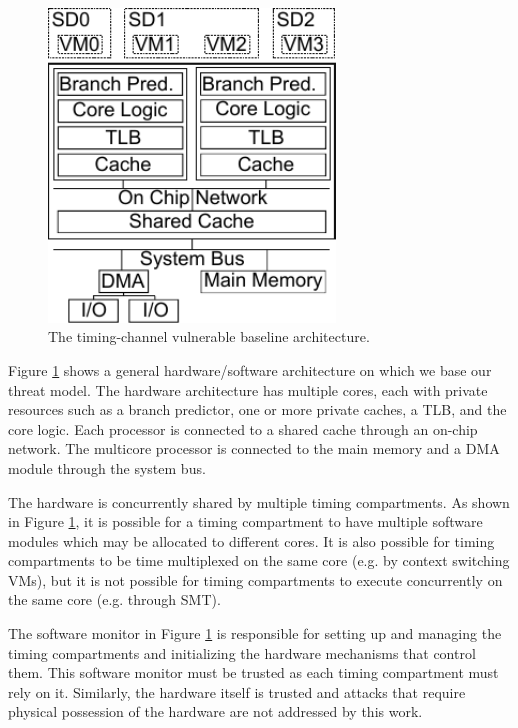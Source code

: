     \begin{figure}
        \begin{center}
            \includegraphics[width=3in]{figs/baseline.pdf}
            \caption{The timing-channel vulnerable baseline architecture.}
            \label{fig:baseline}
        \end{center}
    \end{figure}

    Figure \ref{fig:baseline} shows a general hardware/software architecture on 
    which we base our threat model. The hardware architecture has multiple 
    cores, each with private resources such as a branch predictor, one or more 
    private caches, a TLB, and the core logic. Each processor is connected to a 
    shared cache through an on-chip network. The multicore processor is 
    connected to the main memory and a DMA module through the system bus. 

    The hardware is concurrently shared by multiple timing compartments. As 
    shown in Figure \ref{fig:baseline}, it is possible for a timing compartment 
    to have multiple software modules which may be allocated to different 
    cores. It is also possible for timing compartments to be time multiplexed 
    on the same core (e.g.  by context switching VMs), but it is not possible 
    for timing compartments to execute concurrently on the same core (e.g.  
    through SMT).
    
    The software monitor in Figure \ref{fig:baseline} is responsible for 
    setting up and managing the timing compartments and initializing the 
    hardware mechanisms that control them. This software monitor must be 
    trusted as each timing compartment must rely on it. Similarly, the hardware 
    itself is trusted and attacks that require physical possession of the 
    hardware are not addressed by this work.
